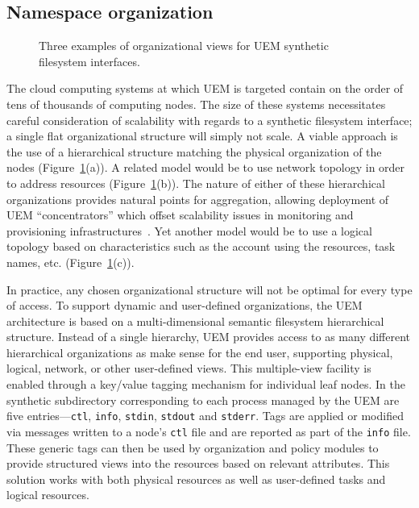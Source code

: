\documentclass{sig-alternate}
\begin{document}
\subsection{Namespace organization}
\label{section:organization}

\begin{figure}
\hspace{0.1in}
\hspace{0.1in}
\vspace{-0.1in}
\caption{Three examples of organizational views for UEM synthetic filesystem interfaces.}
\label{fig:org-view}
\end{figure}

The cloud computing systems at which UEM is targeted contain on the order
of tens of thousands of computing nodes. 
The size of these systems necessitates
careful consideration of scalability with regards to a synthetic filesystem
interface; a single flat organizational structure will simply not scale.
A viable approach is
the use of a hierarchical structure matching the physical organization of the
nodes (Figure~\ref{fig:org-view}(a)).
A related model would be to use network topology in order to address
resources (Figure~\ref{fig:org-view}(b)).
The nature of either of these hierarchical organizations provides natural
points for aggregation, allowing deployment of UEM ``concentrators'' which
offset scalability issues in monitoring and provisioning 
infrastructures~\cite{evh2008mtags}.
Yet another model would be to use a logical topology based on characteristics
such as the account using the resources, task names, etc.  
(Figure~\ref{fig:org-view}(c)).

In practice, any chosen organizational structure will not be
optimal for every type of access.   
To support dynamic and user-defined organizations, the UEM architecture
is based on
a multi-dimensional semantic filesystem hierarchical structure.
Instead of a single hierarchy, UEM provides access to as many different
hierarchical organizations as make sense for the end user, supporting
physical, logical, network, or other user-defined views.
This multiple-view facility is enabled through a key/value tagging mechanism for
individual leaf nodes. In the synthetic subdirectory corresponding to each process
managed by the UEM are five entries---{\tt ctl}, {\tt info}, {\tt stdin}, {\tt stdout} and {\tt stderr}.
Tags are applied or modified via messages written to a node's {\tt ctl} file
and are reported as part of the {\tt info} file.
These generic tags can then be used by organization and policy
modules to provide structured views into the resources based on relevant
attributes.
This solution works with both physical resources as well as user-defined tasks 
and logical resources.
\end{document}
